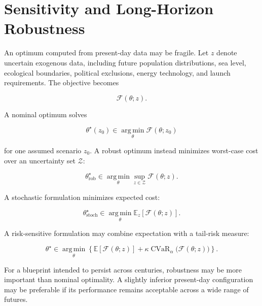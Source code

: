 \documentclass[11pt,fleqn]{book}
\numberwithin{equation}{chapter}
\theoremstyle{plain}
\theoremstyle{definition}
\theoremstyle{remark}
\newcommand{\argmin}{\operatorname*{arg\,min}}
\begin{document}
\section{Sensitivity and Long-Horizon Robustness}

An optimum computed from present-day data may be fragile. Let \(z\) denote uncertain exogenous data, including future population distributions, sea level, ecological boundaries, political exclusions, energy technology, and launch requirements. The objective becomes

\begin{equation}
    \mathcal{F}(\theta;z).
\end{equation}

A nominal optimum solves

\begin{equation}
    \theta^\star(z_0)
    \in
    \argmin_\theta
    \mathcal{F}(\theta;z_0)
\end{equation}

for one assumed scenario \(z_0\). A robust optimum instead minimizes worst-case cost over an uncertainty set \(\mathcal{Z}\):

\begin{equation}
    \theta^\star_{\mathrm{rob}}
    \in
    \argmin_{\theta}
    \sup_{z\in\mathcal{Z}}
    \mathcal{F}(\theta;z).
\end{equation}

A stochastic formulation minimizes expected cost:

\begin{equation}
    \theta^\star_{\mathrm{stoch}}
    \in
    \argmin_{\theta}
    \mathbb{E}_{z}
    \left[
      \mathcal{F}(\theta;z)
    \right].
\end{equation}

A risk-sensitive formulation may combine expectation with a tail-risk measure:

\begin{equation}
    \theta^\star
    \in
    \argmin_{\theta}
    \left\{
      \mathbb{E}
      [\mathcal{F}(\theta;z)]
      +
      \kappa
      \operatorname{CVaR}_{\alpha}
      \bigl(
        \mathcal{F}(\theta;z)
      \bigr)
    \right\}.
\end{equation}

For a blueprint intended to persist across centuries, robustness may be more important than nominal optimality. A slightly inferior present-day configuration may be preferable if its performance remains acceptable across a wide range of futures.
\end{document}
